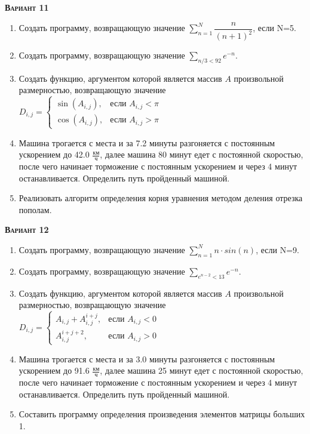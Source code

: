 \textsc{\textbf{Вариант 11}}
\begin{enumerate}
\item  Создать программу, возвращающую значение $\sum\limits_{n=1}^{N} \dfrac{n}{(n+1)^2}            $, если N=5. 
\item  Создать программу, возвращающую значение $\sum\limits_{n/3<      92} {e^{-n}}                      $. 
\item Создать функцию, аргументом которой является массив $A$ произвольной размерностью, возвращающую значение $D_{i,j}=\begin{cases} \sin(A_{i,j}), & \text{если } A_{i,j}<\pi \\ \cos(A_{i,j}), & \text{если } A_{i,j}>\pi \end{cases}                     $ 
\item Машина трогается с места и за  7.2 минуты разгоняется с постоянным ускорением до 42.0 ${\frac{км}{ч}}$, далее машина   80 минут едет с постоянной скоростью, после чего начинает торможение с постоянным ускорением и через   4 минут останавливается. Определить путь пройденный машиной.  \item Реализовать алгоритм определения корня уравнения методом деления отрезка пополам.                                                                                                                                                                                              

\end{enumerate}
\textsc{\textbf{Вариант 12}}
\begin{enumerate}
\item  Создать программу, возвращающую значение $\sum\limits_{n=1}^{N} n \cdot sin(n)                $, если N=9. 
\item  Создать программу, возвращающую значение $\sum\limits_{e^{n-2}<  13} {e^{-n}}                      $. 
\item Создать функцию, аргументом которой является массив $A$ произвольной размерностью, возвращающую значение $D_{i,j}=\begin{cases} A_{i,j}+A_{i,j}^{i+j}, & \text{если } {A_{i,j}}<0 \\  A_{i,j}^{i+j+2}, & \text{если } {A_{i,j}}>0 \end{cases}          $ 
\item Машина трогается с места и за  3.0 минуты разгоняется с постоянным ускорением до 91.6 ${\frac{км}{ч}}$, далее машина   25 минут едет с постоянной скоростью, после чего начинает торможение с постоянным ускорением и через   4 минут останавливается. Определить путь пройденный машиной.  \item Составить программу определения произведения элементов матрицы больших 1.                                                                                                                                                                                                              

\end{enumerate}
